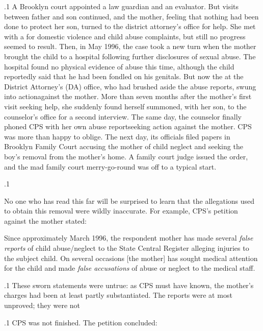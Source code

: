 \documentclass[11pt, twoside]{article}
\begin{document}
{\p.1{%
A Brooklyn court appointed a law guardian and an evaluator. But
visits between father and son continued, and the mother, feeling that
nothing had been done to protect her son, turned to the district attorney's office for help. She met with a  for domestic violence
and child abuse complaints, but still no progress seemed to result.
Then, in May 1996, the case took a new turn when the mother brought
the child to a hospital following further disclosures of sexual abuse. The
hospital found no physical evidence of abuse this time, although the
child reportedly said that he had been fondled on his genitals. But now
the  at the District Attorney's (DA) office, who had brushed
aside the abuse reports, swung into action\mdash{}against the mother. More
than seven months after the mother's first visit seeking help, she suddenly found herself summoned, with her son, to the counselor's office
for a second interview. The same day, the counselor finally phoned CPS
with her own abuse report\mdash{}seeking action against the mother.
CPS was more than happy to oblige. The next day, its officials filed
papers in Brooklyn Family Court accusing the mother of child neglect
and seeking the boy's  removal from the mother's home. A
family court judge issued the order, and the mad family court
merry-go-round was off to a typical start.
}%

\p.1{%
No one who has read this far will be surprised to learn that the allegations used to obtain this  removal were wildly inaccurate.
For example, CPS's petition against the mother stated:

\begin{blockQuote}
Since approximately March 1996, the respondent mother has made
several \textit{false reports} of child abuse/neglect to the State Central Register alleging injuries to the subject child. On several occasions [the
mother] has sought medical attention for the child and made \textit{false
accusations} of abuse or neglect to the medical staff.
\end{blockQuote}

}%

\p.1{%
These sworn statements were untrue: as CPS must have known, the
mother's charges had been at least partly substantiated. The reports were
at most unproved; they were not 
}%

\p.1{%
CPS was not finished. The petition concluded: 
}%

}
\end{document}
